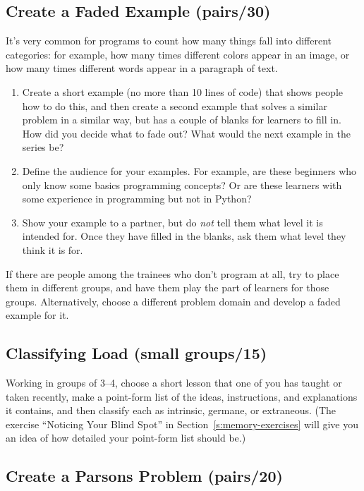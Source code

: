 \subsection*{Create a Faded Example (pairs/30)}

It's very common for programs to count how many things fall into
different categories: for example, how many times different colors
appear in an image, or how many times different words appear in a
paragraph of text.

\begin{enumerate}
\item
  Create a short example (no more than 10 lines of code) that shows
  people how to do this, and then create a second example that solves
  a similar problem in a similar way, but has a couple of blanks for
  learners to fill in. How did you decide what to fade out? What would
  the next example in the series be?
\item
  Define the audience for your examples. For example, are these
  beginners who only know some basics programming concepts? Or are
  these learners with some experience in programming but not in
  Python?
\item
  Show your example to a partner, but do \emph{not} tell them what level it
  is intended for. Once they have filled in the blanks, ask them what
  level they think it is for.
\end{enumerate}

If there are people among the trainees who don't program at all, try to
place them in different groups, and have them play the part of learners
for those groups. Alternatively, choose a different problem domain and
develop a faded example for it.

\subsection*{Classifying Load (small groups/15)}

Working in groups of 3--4, choose a short lesson that one of you has
taught or taken recently, make a point-form list of the ideas,
instructions, and explanations it contains, and then classify each as
intrinsic, germane, or extraneous. (The exercise ``Noticing Your Blind
Spot'' in Section~\ref{s:memory-exercises} will give you an idea of how
detailed your point-form list should be.)

\subsection*{Create a Parsons Problem (pairs/20)}

